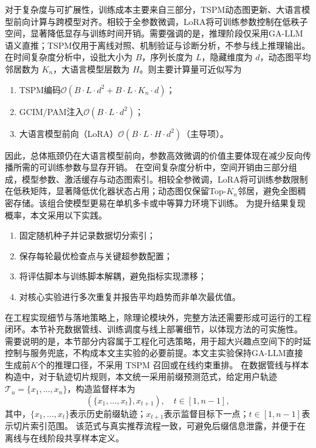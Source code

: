 对于复杂度与可扩展性，训练成本主要来自三部分，TSPM动态图更新、大语言模型前向计算与跨模型对齐。相较于全参数微调，LoRA将可训练参数控制在低秩子空间，显著降低显存与训练时间开销。需要强调的是，推理阶段仅采用GA-LLM语义直推；TSPM仅用于离线对照、机制验证与诊断分析，不参与线上推理输出。
在时间复杂度分析中，设批大小为 $B$，序列长度为 $L$，隐藏维度为 $d$，动态图平均邻居数为 $K_n$，大语言模型层数为 $H$。则主要计算量可近似写为
\begin{enumerate}
    \item {\heiti{}TSPM编码}$\mathcal{O}(B\cdot L\cdot d^2 + B\cdot L\cdot K_n\cdot d)$；
    \item {\heiti{}GCIM/PAM注入}$\mathcal{O}(B\cdot L\cdot d^2)$；
    \item {\heiti{}大语言模型前向（LoRA）}$\mathcal{O}(B\cdot L\cdot H\cdot d^2)$（主导项）。
\end{enumerate}
\par\indent 因此，总体瓶颈仍在大语言模型前向，参数高效微调的价值主要体现在减少反向传播所需的可训练参数与显存开销。
在空间复杂度分析中，空间开销由三部分组成，模型参数、激活缓存与动态图索引。相较全参微调，LoRA将可训练参数限制在低秩矩阵，显著降低优化器状态占用；动态图仅保留Top-$K_n$邻居，避免全图稠密存储。该组合使模型更易在单机多卡或中等算力环境下训练。
为提升结果复现概率，本文采用以下实践。
\begin{enumerate}
    \item 固定随机种子并记录数据切分索引；
    \item 保存每轮最优检查点与关键超参数配置；
    \item 将评估脚本与训练脚本解耦，避免指标实现漂移；
    \item 对核心实验进行多次重复并报告平均趋势而非单次最优值。
\end{enumerate}
\par\indent 在工程实现细节与落地策略上，除理论模块外，完整方法还需要形成可运行的工程闭环。本节补充数据管线、训练调度与线上部署细节，以体现方法的可实施性。
需要说明的是，本节部分内容属于工程化可选策略，用于超大兴趣点空间下的时延控制与服务兜底，不构成本文主实验的必要前提。本文主实验保持GA-LLM直接生成前$K$个的推理口径，不采用 TSPM 召回或在线约束重排。
在数据管线与样本构造中，对于轨迹切片规则，本文统一采用前缀预测范式，给定用户轨迹 $ \mathcal{T}_{u}=\{x_1,\ldots,x_n\}$，构造监督样本为
\begin{equation}
(\{x_1,\ldots,x_t\},x_{t+1}),\quad t\in[1,n-1],
\end{equation}
其中，$\{x_1,\ldots,x_t\}$表示历史前缀轨迹；$x_{t+1}$表示监督目标下一点；$t\in[1,n-1]$表示切片索引范围。
该范式与真实推荐流程一致，可避免后缀信息泄露，并便于在离线与在线阶段共享样本定义。

